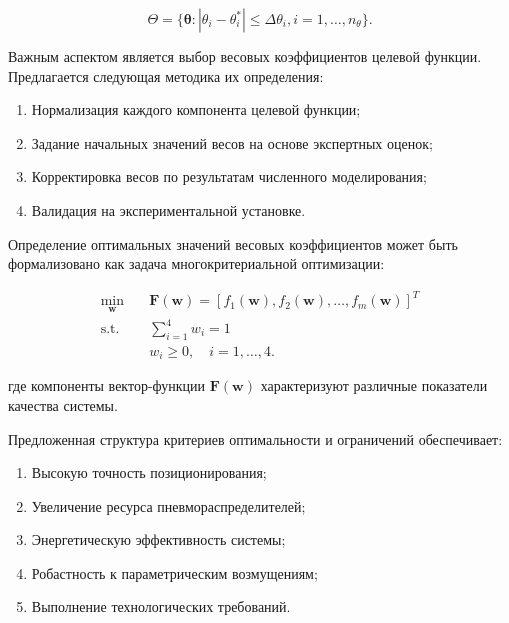 \begin{equation}
	\Theta = \{\boldsymbol{\theta}: |\theta_i - \theta_i^*| \leq \Delta\theta_i, i = 1,\ldots,n_{\theta}\}.
\end{equation}

Важным аспектом является выбор весовых коэффициентов целевой функции. Предлагается следующая методика их определения:

\begin{enumerate}
	\item Нормализация каждого компонента целевой функции;
	\item Задание начальных значений весов на основе экспертных оценок;
	\item Корректировка весов по результатам численного моделирования;
	\item Валидация на экспериментальной установке.
\end{enumerate}

Определение оптимальных значений весовых коэффициентов может быть формализовано как задача многокритериальной оптимизации:

\begin{equation}
	\begin{aligned}
		\min_{\mathbf{w}} \quad & \mathbf{F}(\mathbf{w}) = [f_1(\mathbf{w}), f_2(\mathbf{w}), \ldots, f_m(\mathbf{w})]^T \\
		\text{s.t.} \quad       & \sum_{i=1}^4 w_i = 1                                                                   \\
		                        & w_i \geq 0, \quad i = 1,\ldots,4.
	\end{aligned}
\end{equation}

где компоненты вектор-функции $\mathbf{F}(\mathbf{w})$ характеризуют различные показатели качества системы.

Предложенная структура критериев оптимальности и ограничений обеспечивает:

\begin{enumerate}
	\item Высокую точность позиционирования;
	\item Увеличение ресурса пневмораспределителей;
	\item Энергетическую эффективность системы;
	\item Робастность к параметрическим возмущениям;
	\item Выполнение технологических требований.
\end{enumerate}

